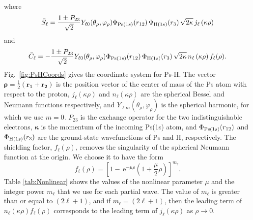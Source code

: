 \documentclass[preprint,showpacs,showkeys,preprintnumbers,amsmath,amssymb,longbibliography,pra,aps]{revtex4-1}
\newcommand{\ee} {\,\text{e}}
\begin{document}
where
\begin{equation}
\label{eq:SBar}
\bar{S}_\ell = \frac{1\pm P_{23}}{\sqrt{2}}Y_{\ell 0}(\theta_\rho,
  \varphi_\rho)\Phi_{{\rm{Ps}}(1s)}\!\left(r_{12}\right) \Phi_{{\rm{H}}(1s)}\!\left(r_3\right)
  \sqrt{2\kappa} \,j_\ell\left(\kappa\rho\right)
\end{equation}
and
\begin{equation}
\label{eq:CBar}
\bar{C}_\ell = -\frac{1\pm P_{23}}{\sqrt{2}}Y_{\ell 0}(\theta_\rho,
  \varphi_\rho)\Phi_{{\rm{Ps}}(1s)}\!\left(r_{12}\right) \Phi_{{\rm{H}}(1s)}\!\left(r_3\right)
  \sqrt{2\kappa} \,n_\ell\left(\kappa\rho\right) f_\ell(\rho).
\end{equation}
Fig.~\ref{fig:PsHCoords} gives the
coordinate system for Ps-H. The vector
$\bm{\rho} = \frac{1}{2}\left(\bm{r_1} + \bm{r_2}\right)$ is the position
vector of the center of mass of the Ps atom with respect to the proton,
$j_\ell\left(\kappa\rho\right)$ and $n_\ell\left(\kappa\rho\right)$ are
the spherical Bessel and Neumann functions respectively, and
$Y_{\ell m}(\theta_\rho, \varphi_\rho)$ is the spherical harmonic,
for which we use $m = 0$.
$P_{23}$ is the exchange operator for the two indistinguishable electrons,
$\bm{\kappa}$ is the momentum of the incoming Ps(1s) atom, and
$\Phi_{{\rm{Ps}}(1s)}\!\left(r_{12}\right)$ and
$\Phi_{{\rm{H}}(1s)}\!\left(r_3\right)$ are the ground-state wavefunctions
of Ps and H, respectively. The shielding factor, $f_\ell(\rho)$,
removes the singularity of the spherical Neumann function
at the origin. We choose it to have the form
\begin{equation}
f_\ell(\rho) = \left[1 - \ee^{-\mu \rho} \left(1+\frac{\mu}{2}\rho\right)
\right]^{m_\ell}.
\label{eq:PartialWaveShielding}
\end{equation}
Table \ref{tab:Nonlinear} shows the values of the
nonlinear parameter $\mu$ and the integer power $m_\ell$
that we use for each partial wave. The value of $m_\ell$ 
is greater than or equal to $(2\ell + 1)$,
and if $m_\ell = (2\ell + 1)$, then the leading term of 
$n_\ell\left(\kappa\rho\right) f_\ell(\rho)$ corresponds to the leading
term of $j_\ell\left(\kappa\rho\right)$ as $\rho \to 0$.
\end{document}
